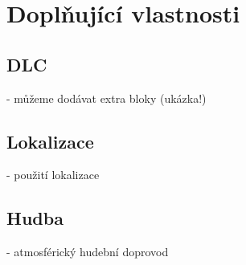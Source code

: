 
\section{Doplňující vlastnosti}

\subsection{DLC}

- můžeme dodávat extra bloky (ukázka!)

\subsection{Lokalizace}

- použití lokalizace 

\subsection{Hudba}

- atmosférický hudební doprovod
